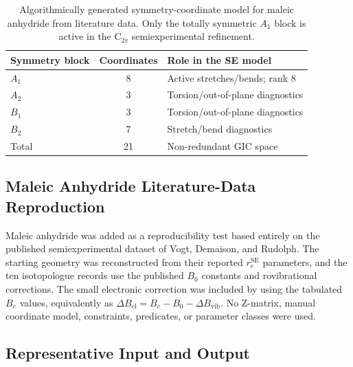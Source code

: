\documentclass[12pt]{article}
\begin{document}
\begin{table}
\caption{Algorithmically generated symmetry-coordinate model for maleic
anhydride from literature data. Only the totally symmetric $A_1$ block is
active in the C$_{2v}$ semiexperimental refinement.}
\label{tab:si-maleic-symmetry-gics}
\small
\begin{tabular}{lcl}
\toprule
Symmetry block & Coordinates & Role in the SE model \\
\midrule
$A_1$ & 8 & Active stretches/bends; rank 8 \\
$A_2$ & 3 & Torsion/out-of-plane diagnostics \\
$B_1$ & 3 & Torsion/out-of-plane diagnostics \\
$B_2$ & 7 & Stretch/bend diagnostics \\
\midrule
Total & 21 & Non-redundant GIC space \\
\bottomrule
\end{tabular}
\end{table}

\subsection{Maleic Anhydride Literature-Data Reproduction}

Maleic anhydride was added as a reproducibility test based entirely on the
published semiexperimental dataset of Vogt, Demaison, and Rudolph. The
starting geometry was reconstructed from their reported $r_e^\mathrm{SE}$
parameters, and the ten isotopologue records use the published $B_0$
constants and rovibrational corrections. The small electronic correction was
included by using the tabulated $B_e$ values, equivalently as
$\Delta B_\mathrm{el}=B_e-B_0-\Delta B_\mathrm{vib}$. No Z-matrix, manual
coordinate model, constraints, predicates, or parameter classes were used.

\subsection{Representative Input and Output}
\label{sec:si-input-output}
\end{document}
